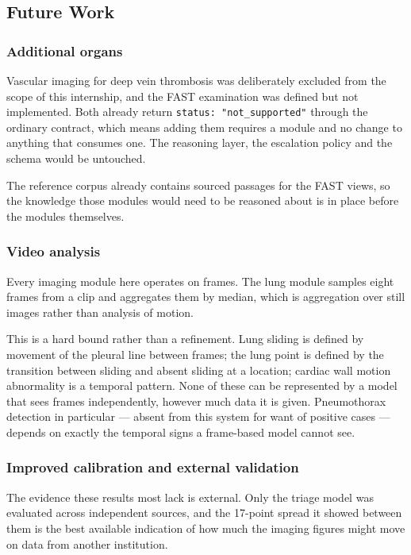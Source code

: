 \subsection{Future Work}
\label{subsec:conclusion-future}

\subsubsection{Additional organs}

Vascular imaging for deep vein thrombosis was deliberately excluded from the scope of this
internship, and the FAST examination was defined but not implemented. Both already return
\texttt{status: "not\_supported"} through the ordinary contract, which means adding them
requires a module and no change to anything that consumes one. The reasoning layer, the
escalation policy and the schema would be untouched.

The reference corpus already contains sourced passages for the FAST views, so the knowledge
those modules would need to be reasoned about is in place before the modules themselves.

\subsubsection{Video analysis}

Every imaging module here operates on frames. The lung module samples eight frames from a clip
and aggregates them by median, which is aggregation over still images rather than analysis of
motion.

This is a hard bound rather than a refinement. Lung sliding is defined by movement of the
pleural line between frames; the lung point is defined by the transition between sliding and
absent sliding at a location; cardiac wall motion abnormality is a temporal pattern. None of
these can be represented by a model that sees frames independently, however much data it is
given. Pneumothorax detection in particular --- absent from this system for want of positive
cases --- depends on exactly the temporal signs a frame-based model cannot see.

\subsubsection{Improved calibration and external validation}

The evidence these results most lack is external. Only the triage model was evaluated across
independent sources, and the 17-point spread it showed between them is the best available
indication of how much the imaging figures might move on data from another institution.

